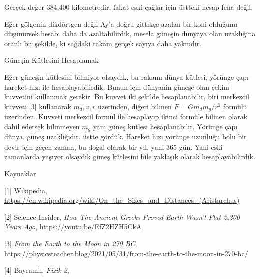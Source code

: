 \documentclass[12pt,fleqn]{article}\usepackage{../../common}
\begin{document}
Gerçek değer 384,400 kilometredir, fakat eski çağlar için üstteki hesap fena
değil.

Eğer gölgenin dikdörtgen değil Ay'a doğru gittikçe azalan bir koni olduğunu
düşünürsek hesabı daha da azaltabilirdik, mesela güneşin dünyaya olan uzaklığına
oranlı bir şekilde, ki sağdaki rakam gerçek sayıya daha yakındır.

Güneşin Kütlesini Hesaplamak

Eğer güneşin kütlesini bilmiyor olsaydık, bu rakamı dünya kütlesi, yörünge çapı
hareket hızı ile hesaplayabilirdik. Bunun için dünyanin güneşe olan çekim
kuvvetini kullanmak gerekir. Bu kuvvet iki şekilde hesaplanabilir, biri
merkezcil kuvveti [3] kullanarak $m_d, v, r$ üzerinden, diğeri bilinen $F = G
m_d m_g / r^2$ formülü üzerinden. Kuvveti merkezcil formül ile hesaplayıp ikinci
formüle bilinen olarak dahil edersek bilinmeyen $m_g$ yani güneş kütlesi
hesaplanabilir. Yörünge çapı dünya, güneş uzaklığıdır, üstte gördük. Hareket
hızı yörünge uzunluğu bolu bir devir için geçen zaman, bu doğal olarak bir yıl,
yani 365 gün. Yani eski zamanlarda yaşıyor olsaydık güneş kütlesini bile
yaklaşık olarak hesaplayabilirdik.

Kaynaklar

[1] Wikipedia,
    \url{https://en.wikipedia.org/wiki/On_the_Sizes_and_Distances_(Aristarchus)}

[2] Science Insider, {\em How The Ancient Greeks Proved Earth Wasn't Flat 2,200 Years Ago},
    \url{https://youtu.be/EfZ2HZH5CkA}

[3] {\em From the Earth to the Moon in 270 BC},
    \url{https://physicsteacher.blog/2021/05/31/from-the-earth-to-the-moon-in-270-bc/}
    
[4] Bayramlı, {\em Fizik 2},
    
\end{document}

